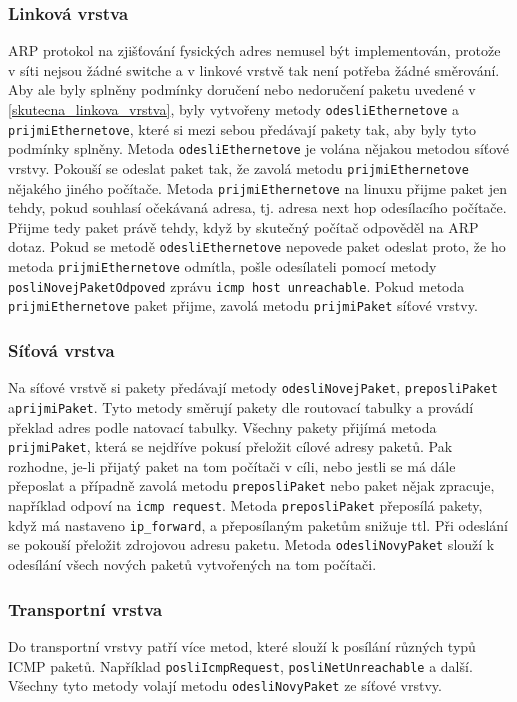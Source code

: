 \subsubsection{Linková vrstva}

ARP protokol na zjišťování fysických adres nemusel být implementován, protože v síti nejsou žádné switche a v linkové vrstvě tak není potřeba žádné směrování. Aby ale byly splněny podmínky doručení nebo nedoručení paketu uvedené v \ref{skutecna_linkova_vrstva}, byly vytvořeny metody \verb|odesliEthernetove| a \verb|prijmiEthernetove|, které si mezi sebou předávají pakety tak, aby byly tyto podmínky splněny. Metoda \verb|odesliEthernetove| je volána nějakou metodou síťové vrstvy. Pokouší se odeslat paket tak, že zavolá metodu \verb|prijmiEthernetove| nějakého jiného počítače. Metoda \verb|prijmiEthernetove| na linuxu přijme paket jen tehdy, pokud souhlasí očekávaná adresa, tj. adresa next hop odesílacího počítače. Přijme tedy paket právě tehdy, když by skutečný počítač odpověděl na ARP dotaz. Pokud se metodě \verb|odesliEthernetove| nepovede paket odeslat proto, že ho metoda \verb|prijmiEthernetove| odmítla, pošle odesílateli pomocí metody \verb|posliNovejPaketOdpoved| zprávu \verb|icmp host unreachable|. Pokud metoda \verb|prijmiEthernetove| paket přijme, zavolá metodu \verb|prijmiPaket| síťové vrstvy.

\subsubsection{Síťová vrstva}

Na síťové vrstvě si pakety předávají metody \verb|odesliNovejPaket|, \verb|preposliPaket| a\linebreak \verb|prijmiPaket|. Tyto metody směrují pakety dle routovací tabulky a provádí překlad adres podle natovací tabulky. Všechny pakety přijímá metoda \verb|prijmiPaket|, která se nejdříve pokusí přeložit cílové adresy paketů. Pak rozhodne, je-li přijatý paket na tom počítači v cíli, nebo jestli se má dále přeposlat a případně zavolá metodu \verb|preposliPaket| nebo paket nějak zpracuje, například odpoví na \verb|icmp request|. Metoda \verb|preposliPaket| přeposílá pakety, když má nastaveno \verb|ip_forward|, a přeposílaným paketům snižuje ttl. Při odeslání se pokouší přeložit zdrojovou adresu paketu. Metoda \verb|odesliNovyPaket| slouží k odesílání všech nových paketů vytvořených na tom počítači.

\subsubsection{Transportní vrstva}

Do transportní vrstvy patří více metod, které slouží k posílání různých typů ICMP paketů. Například \verb|posliIcmpRequest|, \verb|posliNetUnreachable| a další. Všechny tyto metody volají metodu \verb|odesliNovyPaket| ze síťové vrstvy.
  
  
